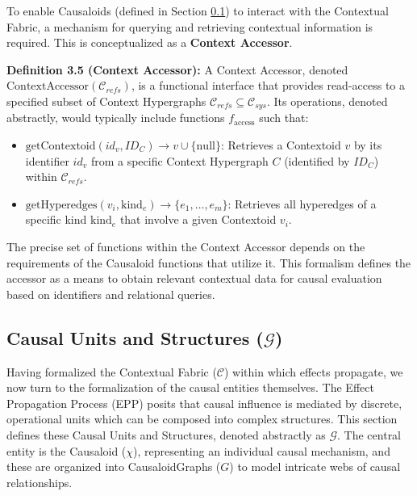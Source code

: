 To enable Causaloids (defined in Section \ref{sec:formalization_causal_units}) to interact with the Contextual Fabric, a mechanism for querying and retrieving contextual information is required. This is conceptualized as a \textbf{Context Accessor}.

\noindent\textbf{Definition 3.5 (Context Accessor):} A Context Accessor, denoted \(\text{ContextAccessor}(\mathcal{C}_{refs})\), is a functional interface that provides read-access to a specified subset of Context Hypergraphs \(\mathcal{C}_{refs} \subseteq \mathcal{C}_{sys}\).
Its operations, denoted abstractly, would typically include functions \(f_{\text{access}}\) such that: %
\begin{itemize}
    \item \(\text{getContextoid}(id_v, ID_C) \to v \cup \{\text{null}\}\): Retrieves a Contextoid \(v\) by its identifier \(id_v\) from a specific Context Hypergraph \(C\) (identified by \(ID_C\)) within \(\mathcal{C}_{refs}\).
    \item \(\text{getHyperedges}(v_i, \text{kind}_e) \to \{e_1, \dots, e_m\}\): Retrieves all hyperedges of a specific kind \(\text{kind}_e\) that involve a given Contextoid \(v_i\).
\end{itemize}
The precise set of functions within the Context Accessor depends on the requirements of the Causaloid functions that utilize it. This formalism defines the accessor as a means to obtain relevant contextual data for causal evaluation based on identifiers and relational queries.

\clearpage


\subsection[Causal Units and Structures (G)]{Causal Units and Structures (\(\mathcal{G}\))} %
\label{sec:formalization_causal_units}

Having formalized the Contextual Fabric (\(\mathcal{C}\)) within which effects propagate, we now turn to the formalization of the causal entities themselves. The Effect Propagation Process (EPP) posits that causal influence is mediated by discrete, operational units which can be composed into complex structures. This section defines these Causal Units and Structures, denoted abstractly as \(\mathcal{G}\). The central entity is the Causaloid (\(\chi\)), representing an individual causal mechanism, and these are organized into CausaloidGraphs (\(G\)) to model intricate webs of causal relationships.

